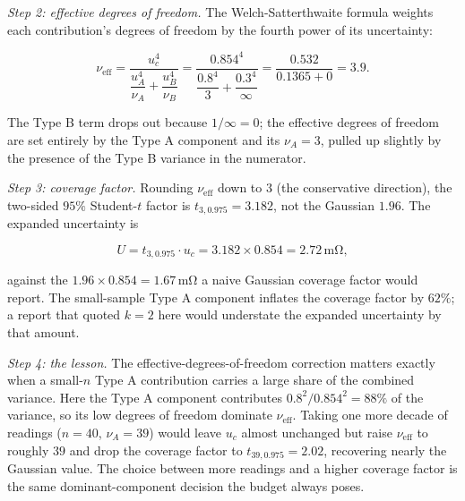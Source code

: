 \emph{Step 2: effective degrees of freedom.} The
Welch-Satterthwaite formula weights each contribution's degrees of
freedom by the fourth power of its uncertainty:

\[
\nu_{\text{eff}} = \frac{u_{c}^{4}}
{\dfrac{u_{A}^{4}}{\nu_{A}} + \dfrac{u_{B}^{4}}{\nu_{B}}}
= \frac{0.854^{4}}{\dfrac{0.8^{4}}{3} + \dfrac{0.3^{4}}{\infty}}
= \frac{0.532}{0.1365 + 0} = 3.9.
\]

The Type B term drops out because $1/\infty = 0$; the effective
degrees of freedom are set entirely by the Type A component and its
$\nu_{A} = 3$, pulled up slightly by the presence of the Type B
variance in the numerator.

\emph{Step 3: coverage factor.} Rounding $\nu_{\text{eff}}$ down to
$3$ (the conservative direction), the two-sided $95\%$ Student-$t$
factor is $t_{3, 0.975} = 3.182$, not the Gaussian $1.96$. The
expanded uncertainty is

\[
U = t_{3, 0.975} \cdot u_{c} = 3.182 \times 0.854
= 2.72\,\si{\milli\ohm},
\]

against the $1.96 \times 0.854 = 1.67\,\si{\milli\ohm}$ a naive
Gaussian coverage factor would report. The small-sample Type A
component inflates the coverage factor by $62\%$; a report that
quoted $k = 2$ here would understate the expanded uncertainty by
that amount.

\emph{Step 4: the lesson.} The effective-degrees-of-freedom
correction matters exactly when a small-$n$ Type A contribution
carries a large share of the combined variance. Here the Type A
component contributes $0.8^{2}/0.854^{2} = 88\%$ of the variance,
so its low degrees of freedom dominate $\nu_{\text{eff}}$. Taking
one more decade of readings ($n = 40$, $\nu_{A} = 39$) would leave
$u_{c}$ almost unchanged but raise $\nu_{\text{eff}}$ to roughly
$39$ and drop the coverage factor to $t_{39, 0.975} = 2.02$,
recovering nearly the Gaussian value. The choice between more
readings and a higher coverage factor is the same
dominant-component decision the budget always poses.

